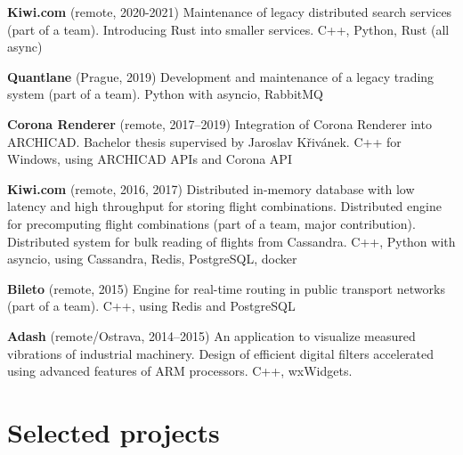 \documentclass[10pt,a4paper]{article}
\begin{document}
\begin{multicols}{2}
\textbf{Kiwi.com} (remote, 2020-2021)
  \newline Maintenance of legacy distributed search services (part of a team).
  \newline Introducing Rust into smaller services.
  \newline C++, Python, Rust (all async)

\textbf{Quantlane} (Prague, 2019)
  \newline Development and maintenance of a legacy trading system (part of a
  team).
  \newline Python with asyncio, RabbitMQ

\textbf{Corona Renderer} (remote, 2017–2019)
  \newline Integration of Corona Renderer into ARCHICAD.
  \newline Bachelor thesis supervised by Jaroslav Křivánek.
  \newline C++ for Windows, using ARCHICAD APIs and Corona API

\textbf{Kiwi.com} (remote, 2016, 2017)
  \newline Distributed in-memory database with low latency and high throughput
    for storing flight combinations.
  \newline Distributed engine for precomputing flight combinations (part of a
    team, major contribution).
  \newline Distributed system for bulk reading of flights from Cassandra.
  \newline C++, Python with asyncio, using Cassandra, Redis, PostgreSQL,
    docker

\textbf{Bileto} (remote, 2015)
  \newline Engine for real-time routing in public transport networks (part of a
  team).
  \newline C++, using Redis and PostgreSQL

\columnbreak

\textbf{Adash} (remote/Ostrava, 2014–2015)
  \newline An application to visualize measured vibrations of industrial
  machinery.
  \newline Design of efficient digital filters accelerated using advanced
  features of ARM processors.
  \newline C++, wxWidgets.


\section*{Selected projects}


\end{multicols}
\end{document}

